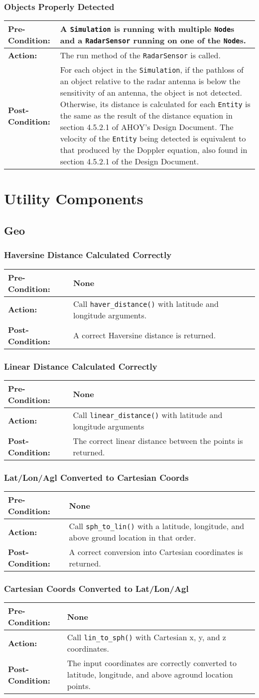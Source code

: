 \documentclass[titlepage]{article}
\newcommand{\testcase}[3]{
    \begin{center}
    \begin{tabular}{| l | p{0.7\textwidth}|}
        \hline
        \rowcolor[gray]{0.8}\textbf{Pre-Condition:} & #1 \\ \hline
        \textbf{Action:} & #2 \\ \hline
        \rowcolor[gray]{0.8}\textbf{Post-Condition:} & #3 \\ \hline
    \end{tabular}
    \end{center}
}
\begin{document}
\subsubsection{Objects Properly Detected}
\testcase{A \texttt{Simulation} is running with multiple \texttt{Node}s and a \texttt{RadarSensor} running on one of the \texttt{Node}s.}{The run method of the \texttt{RadarSensor} is called.}{For each object in the \texttt{Simulation}, if the pathloss of an object relative to the radar antenna is below the sensitivity of an antenna, the object is not detected.  Otherwise, its distance is calculated for each \texttt{Entity} is the same as the result of the distance equation in section 4.5.2.1 of AHOY's Design Document. The velocity of the \texttt{Entity} being detected is equivalent to that produced by the Doppler equation, also found in section 4.5.2.1 of the Design Document.}

\section{Utility Components}
\subsection{Geo}
\subsubsection{Haversine Distance Calculated Correctly}
\testcase{None}{Call \texttt{haver\_distance()} with latitude and longitude arguments.}{A correct Haversine distance is returned.}

\subsubsection{Linear Distance Calculated Correctly}
\testcase{None}{Call \texttt{linear\_distance()} with latitude and longitude arguments}{The correct linear distance between the points is returned.}

\subsubsection{Lat/Lon/Agl Converted to Cartesian Coords}
\testcase{None}{Call \texttt{sph\_to\_lin()} with a latitude, longitude, and above ground location in that order.}{A correct conversion into Cartesian coordinates is returned.}

\subsubsection{Cartesian Coords Converted to Lat/Lon/Agl}
\testcase{None}{Call \texttt{lin\_to\_sph()} with Cartesian x, y, and z coordinates.}{The input coordinates are correctly converted to latitude, longitude, and above aground location points.}
\end{document}
